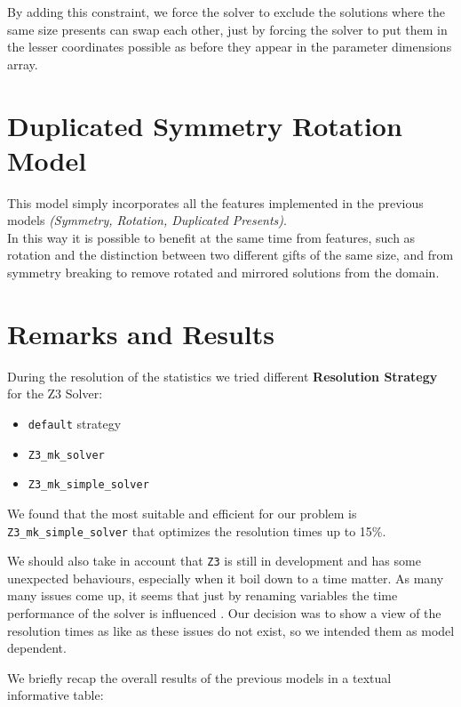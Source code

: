 By adding this constraint, we force the solver to exclude the solutions where the same size presents can swap each other,
just by forcing the solver to put them in the lesser coordinates possible as before they appear in the parameter dimensions array.



\section{Duplicated Symmetry Rotation Model}

This model simply incorporates all the features implemented in the previous models \textit{(Symmetry, Rotation, Duplicated Presents)}.
\\
In this way it is possible to benefit at the same time from features, such as rotation and the distinction between two different gifts of the same size,
and from symmetry breaking to remove rotated and mirrored solutions from the domain.  




\section{Remarks and Results}
During the resolution of the statistics we tried different \textbf{Resolution Strategy} for the Z3 Solver:
\begin{itemize}
	\item \texttt{default} strategy
	\item \texttt{Z3\_mk\_solver}
	\item \texttt{Z3\_mk\_simple\_solver}
\end{itemize}
We found that the most suitable and efficient for our problem is \texttt{Z3\_mk\_simple\_solver} that optimizes the resolution times up to 15\%.

We should also take in account that \texttt{Z3} is still in development and has some unexpected behaviours, especially when it boil down to a time matter.
As many many issues come up, it seems that just by renaming variables the time performance of the solver is influenced \cite{z3issues}.
Our decision was to show a view of the resolution times as like as these issues do not exist, so we intended them as model dependent.

We briefly recap the overall results of the previous models in a textual informative table:

